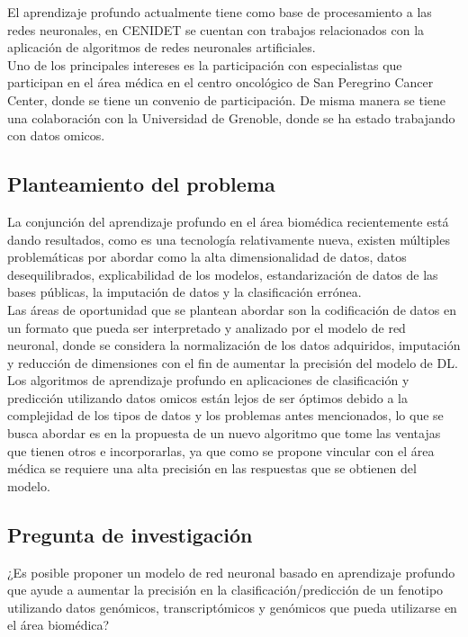 El aprendizaje profundo actualmente tiene como base de procesamiento a las redes neuronales, en CENIDET se cuentan con trabajos relacionados con la aplicación de algoritmos de redes neuronales artificiales.\\

Uno de los principales intereses es la participación con especialistas que participan en el área médica en el centro oncológico de San Peregrino Cancer Center, donde se tiene un convenio de participación. De misma manera se tiene una colaboración con la Universidad de Grenoble, donde se ha estado trabajando con datos omicos.

\subsection{Planteamiento del problema}

La conjunción del aprendizaje profundo en el área biomédica recientemente está dando resultados, como es una tecnología relativamente nueva, existen múltiples problemáticas por abordar como la alta dimensionalidad de datos, datos desequilibrados, explicabilidad de los modelos, estandarización de datos de las bases públicas, la imputación de datos y la clasificación errónea.\\

Las áreas de oportunidad que se plantean abordar son la codificación de datos en un formato que pueda ser interpretado y analizado por el modelo de red neuronal, donde se considera la normalización de los datos adquiridos, imputación y reducción de dimensiones con el fin de aumentar la precisión del modelo de DL.\\

Los algoritmos de aprendizaje profundo en aplicaciones de clasificación y predicción utilizando datos omicos están lejos de ser óptimos debido a la complejidad de los tipos de datos y los problemas antes mencionados, lo que se busca abordar es en la propuesta de un nuevo algoritmo que tome las ventajas que tienen otros e incorporarlas, ya que como se propone vincular con el área médica se requiere una alta precisión en las respuestas que se obtienen del modelo.

\subsection{Pregunta de investigación}

¿Es posible proponer un modelo de red neuronal basado en aprendizaje profundo que ayude a aumentar la precisión en la clasificación/predicción de un fenotipo utilizando datos genómicos, transcriptómicos y genómicos que pueda utilizarse en el área biomédica?\\


